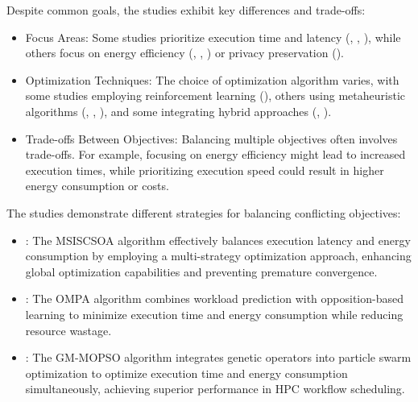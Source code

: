 \documentclass[a4paper, final]{article}
\begin{document}
\noindent Despite common goals, the studies exhibit key differences and trade-offs:
\begin{itemize}
    \item Focus Areas: Some studies prioritize execution time and latency (\cite{bibib:1_acrl}, \cite{bib:3_sandcat}, 
    \cite{bib:4_faas}), while others focus on energy efficiency (\cite{bib:5_epee}, \cite{bib:6_marine}, \cite{bib:10}) 
    or privacy preservation (\cite{bib:7_ppps}).

    \item Optimization Techniques: The choice of optimization algorithm varies, with some studies employing 
    reinforcement learning (\cite{bib:1_acrl}), others using metaheuristic algorithms (\cite{bib:3_sandcat}, \cite{bib:6_marine}, 
    \cite{bib:10}), and some integrating hybrid approaches (\cite{bib:2_faro}, \cite{bib:9}).
    
    \item Trade-offs Between Objectives: Balancing multiple objectives often involves trade-offs. For example, 
    focusing on energy efficiency might lead to increased execution times, while prioritizing execution speed could 
    result in higher energy consumption or costs.
\end{itemize}

\noindent The studies demonstrate different strategies for balancing conflicting objectives:
\begin{itemize}
    \item \cite{bib:3_sandcat}: The MSISCSOA algorithm effectively balances execution latency and energy consumption 
    by employing a multi-strategy optimization approach, enhancing global optimization capabilities and preventing 
    premature convergence.

    \item \cite{bib:6_marine}: The OMPA algorithm combines workload prediction with opposition-based learning to minimize 
    execution time and energy consumption while reducing resource wastage.
    
    \item \cite{bib:10}: The GM-MOPSO algorithm integrates genetic operators into particle swarm optimization to optimize 
    execution time and energy consumption simultaneously, achieving superior performance in HPC workflow scheduling.
\end{itemize}
\end{document}
